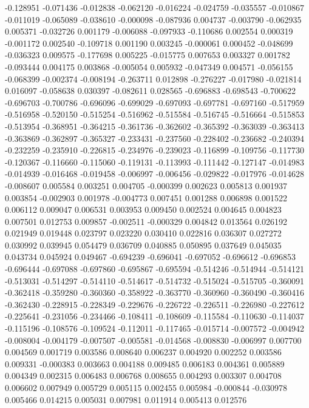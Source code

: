 -0.128951
-0.071436
-0.012838
-0.062120
-0.016224
-0.024759
-0.035557
-0.010867
-0.011019
-0.065089
-0.038610
-0.000098
-0.087936
0.004737
-0.003790
-0.062935
0.005371
-0.032726
0.001179
-0.006088
-0.097933
-0.110686
0.002554
0.000319
-0.001172
0.002540
-0.109718
0.001190
0.003245
-0.000061
0.000452
-0.048699
-0.036323
0.009575
-0.177698
0.005225
-0.015775
0.007653
0.003327
0.001782
-0.093444
0.004175
0.003868
-0.005054
0.005932
-0.047349
0.004571
-0.056155
-0.068399
-0.002374
-0.008194
-0.263711
0.012898
-0.276227
-0.017980
-0.021814
0.016097
-0.058638
0.030397
-0.082611
0.028565
-0.696883
-0.698543
-0.700622
-0.696703
-0.700786
-0.696096
-0.699029
-0.697093
-0.697781
-0.697160
-0.517959
-0.516958
-0.520150
-0.515254
-0.516962
-0.515584
-0.516745
-0.516664
-0.515853
-0.513954
-0.368951
-0.364215
-0.361736
-0.362602
-0.365392
-0.363039
-0.363413
-0.363869
-0.362897
-0.365327
-0.233431
-0.237560
-0.228402
-0.236682
-0.240394
-0.232259
-0.235910
-0.226815
-0.234976
-0.239023
-0.116899
-0.109756
-0.117730
-0.120367
-0.116660
-0.115060
-0.119131
-0.113993
-0.111442
-0.127147
-0.014983
-0.014939
-0.016468
-0.019458
-0.006997
-0.006456
-0.029822
-0.017976
-0.014628
-0.008607
0.005584
0.003251
0.004705
-0.000399
0.002623
0.005813
0.001937
0.003854
-0.002903
0.001978
-0.004773
0.007451
0.001288
0.006898
0.001522
0.006112
0.009047
0.006531
0.003953
0.009450
0.002524
0.004645
0.004823
0.007501
0.012753
0.009857
-0.002511
-0.000329
0.004842
0.013564
0.026192
0.021949
0.019448
0.023797
0.023220
0.030410
0.022816
0.036307
0.027272
0.030992
0.039945
0.054479
0.036709
0.040885
0.050895
0.037649
0.045035
0.043734
0.045924
0.049467
-0.694239
-0.696041
-0.697052
-0.696612
-0.696853
-0.696444
-0.697088
-0.697860
-0.695867
-0.695594
-0.514246
-0.514944
-0.514121
-0.513031
-0.514297
-0.514110
-0.514617
-0.514732
-0.515024
-0.515705
-0.360091
-0.362418
-0.359280
-0.360360
-0.358922
-0.363770
-0.360960
-0.360490
-0.360416
-0.362430
-0.228915
-0.228349
-0.229676
-0.226722
-0.226511
-0.226980
-0.227612
-0.225641
-0.231056
-0.234466
-0.108411
-0.108609
-0.115584
-0.110630
-0.114037
-0.115196
-0.108576
-0.109524
-0.112011
-0.117465
-0.015714
-0.007572
-0.004942
-0.008004
-0.004179
-0.007507
-0.005581
-0.014568
-0.008830
-0.006997
0.007700
0.004569
0.001719
0.003586
0.008640
0.006237
0.004920
0.002252
0.003586
0.009331
-0.000383
0.003663
0.004188
0.009485
0.006183
0.004361
0.005889
0.004349
0.002315
0.006483
0.006768
0.008655
0.004293
0.003307
0.004708
0.006602
0.007949
0.005729
0.005115
0.002455
0.005984
-0.000844
-0.030978
0.005466
0.014215
0.005031
0.007981
0.011914
0.005413
0.012576
